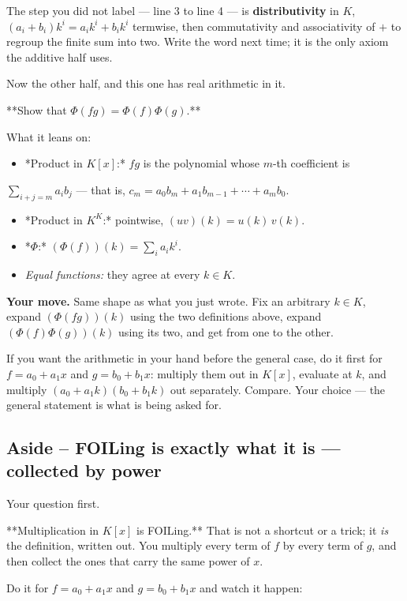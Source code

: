 \documentclass[11pt]{article}
\begin{document}
The step you did not label --- line 3 to line 4 --- is \textbf{distributivity} in $K$,
$(a_i + b_i)k^i = a_ik^i + b_ik^i$ termwise, then commutativity and
associativity of $+$ to regroup the finite sum into two. Write the word next
time; it is the only axiom the additive half uses.

Now the other half, and this one has real arithmetic in it.

**Show that $\Phi(fg) = \Phi(f)\Phi(g)$.**

What it leans on:

\begin{itemize}
  \item *Product in $K[x]$:* $fg$ is the polynomial whose $m$-th coefficient is
\end{itemize}
  $\sum_{i+j=m} a_ib_j$ --- that is, $c_m = a_0b_m + a_1b_{m-1} + \cdots + a_mb_0$.
\begin{itemize}
  \item *Product in $K^K$:* pointwise, $(uv)(k) = u(k)\,v(k)$.
  \item *$\Phi$:* $(\Phi(f))(k) = \sum_i a_ik^i$.
  \item \emph{Equal functions:} they agree at every $k \in K$.
\end{itemize}

\textbf{Your move.} Same shape as what you just wrote. Fix an arbitrary $k \in K$,
expand $(\Phi(fg))(k)$ using the two definitions above, expand
$(\Phi(f)\Phi(g))(k)$ using its two, and get from one to the other.

If you want the arithmetic in your hand before the general case, do it first for
$f = a_0 + a_1x$ and $g = b_0 + b_1x$: multiply them out in $K[x]$, evaluate at
$k$, and multiply $(a_0 + a_1k)(b_0 + b_1k)$ out separately. Compare. Your
choice --- the general statement is what is being asked for.


\subsection*{Aside -- FOILing is exactly what it is --- collected by power}
Your question first.

**Multiplication in $K[x]$ is FOILing.** That is not a shortcut or a trick; it
\emph{is} the definition, written out. You multiply every term of $f$ by every term
of $g$, and then collect the ones that carry the same power of $x$.

Do it for $f = a_0 + a_1x$ and $g = b_0 + b_1x$ and watch it happen:
\end{document}
